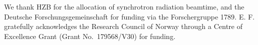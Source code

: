 \begin{acknowledgement}
%
We thank HZB for the allocation of synchrotron radiation beamtime, and the
Deutsche Forschungsgemeinschaft for funding via the Forschergruppe 1789.
E. F. gratefully acknowledges the Research
Council of Norway through a Centre of Excellence Grant (Grant No.\ 179568/V30)
for funding.
%
\end{acknowledgement}
